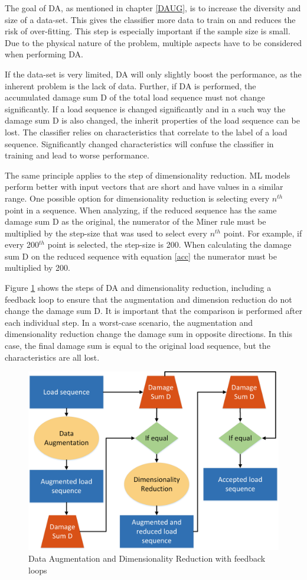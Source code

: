 The goal of DA, as mentioned in chapter \ref{DAUG}, is to increase the diversity and size of a data-set. This gives the classifier more data to train on and reduces the risk of over-fitting.
This step is especially important if the sample size is small. Due to the physical nature of the problem, multiple aspects have to be considered when performing DA.

If the data-set is very limited, DA will only slightly boost the performance, as the inherent problem is the lack of data. Further, if DA is performed, the accumulated damage sum D of the total load sequence must not change significantly. If a load sequence is changed significantly and in a such way the damage sum D is also changed, the inherit properties of the load sequence can be lost. The classifier relies on characteristics that correlate to the label of a load sequence. Significantly changed characteristics will confuse the classifier in training and lead to worse performance.


The same principle applies to the step of dimensionality reduction. ML models perform better with input vectors that are short and have values in a similar range. One possible option for dimensionality reduction is selecting every \(n^{th}\) point in a sequence.
When analyzing, if the reduced sequence has the same damage sum D as the original, the numerator of the Miner rule must be multiplied by the step-size that was used to select every \(n^{th}\) point. For example, if every 200\(^{th}\) point is selected, the step-size is 200. When calculating the damage sum D on the reduced sequence with equation \ref{acc} the numerator must be multiplied by 200.


Figure \ref{fig:DAUG} shows the steps of DA and dimensionality reduction, including a feedback loop to ensure that the augmentation and dimension reduction do not change the damage sum D.
It is important that the comparison is performed after each individual step. In a worst-case scenario, the augmentation and dimensionality reduction change the damage sum in opposite directions. In this case, the final damage sum is equal to the original load sequence, but the characteristics are all lost.

 
\begin{figure}[H]
	\centering
	\includegraphics[width=0.8\linewidth]{IMGs/DAUG.png}
	\caption{Data Augmentation and Dimensionality Reduction with feedback loops}
	\label{fig:DAUG}
\end{figure}


